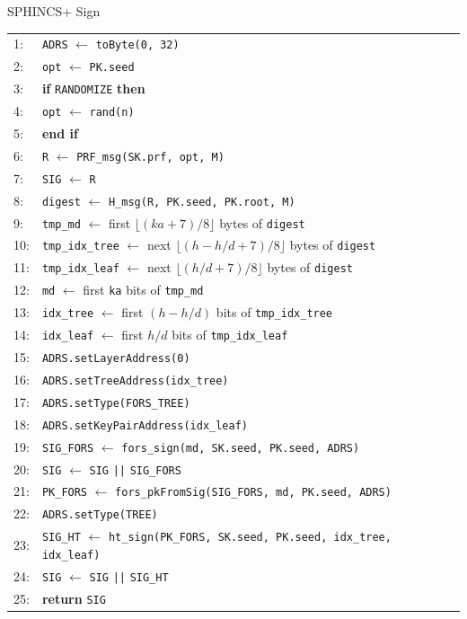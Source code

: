 \documentclass [version=submission]{iacrcc}
\begin{document}
\begin{subsection}{SPHINCS+ Sign}
\begin{algorithm}
    \begin{tabular}{ll}
    1:  & \texttt{ADRS} $\leftarrow$ \texttt{toByte(0, 32)} \\
    2:  & \texttt{opt}  $\leftarrow$ \texttt{PK.seed} \\
    3:  & \textbf{if} \texttt{RANDOMIZE} \textbf{then} \\
    4:  & \quad \texttt{opt}  $\leftarrow$ \texttt{rand(n)} \\
    5:  & \textbf{end if} \\
    6:  & \texttt{R}    $\leftarrow$ \texttt{PRF\_msg(SK.prf, opt, M)} \\
    7:  & \texttt{SIG}  $\leftarrow$ \texttt{R} \\
    8:  & \texttt{digest} $\leftarrow$ \texttt{H\_msg(R, PK.seed, PK.root, M)} \\
    9:  & \texttt{tmp\_md}       $\leftarrow$ first $\lfloor(\mathit{ka}+7)/8\rfloor$ bytes of \texttt{digest} \\
    10: & \texttt{tmp\_idx\_tree} $\leftarrow$ next $\lfloor(h - h/d +7)/8\rfloor$ bytes of \texttt{digest} \\
    11: & \texttt{tmp\_idx\_leaf} $\leftarrow$ next $\lfloor(h/d +7)/8\rfloor$ bytes of \texttt{digest} \\
    12: & \texttt{md}      $\leftarrow$ first \texttt{ka} bits of \texttt{tmp\_md} \\
    13: & \texttt{idx\_tree} $\leftarrow$ first $(h - h/d)$ bits of \texttt{tmp\_idx\_tree} \\
    14: & \texttt{idx\_leaf} $\leftarrow$ first $h/d$ bits of \texttt{tmp\_idx\_leaf} \\
    15: & \texttt{ADRS.setLayerAddress(0)} \\
    16: & \texttt{ADRS.setTreeAddress(idx\_tree)} \\
    17: & \texttt{ADRS.setType(FORS\_TREE)} \\
    18: & \texttt{ADRS.setKeyPairAddress(idx\_leaf)} \\
    19: & \texttt{SIG\_FORS} $\leftarrow$ \texttt{fors\_sign(md, SK.seed, PK.seed, ADRS)} \\
    20: & \texttt{SIG}      $\leftarrow$ \texttt{SIG} \texttt{||} \texttt{SIG\_FORS} \\
    21: & \texttt{PK\_FORS} $\leftarrow$ \texttt{fors\_pkFromSig(SIG\_FORS, md, PK.seed, ADRS)} \\
    22: & \texttt{ADRS.setType(TREE)} \\
    23: & \texttt{SIG\_HT}   $\leftarrow$ \texttt{ht\_sign(PK\_FORS, SK.seed, PK.seed, idx\_tree, idx\_leaf)} \\
    24: & \texttt{SIG}      $\leftarrow$ \texttt{SIG} \texttt{||} \texttt{SIG\_HT} \\
    25: & \textbf{return} \texttt{SIG}
    \end{tabular}
\end{algorithm}




\end{subsection}
\end{document}

